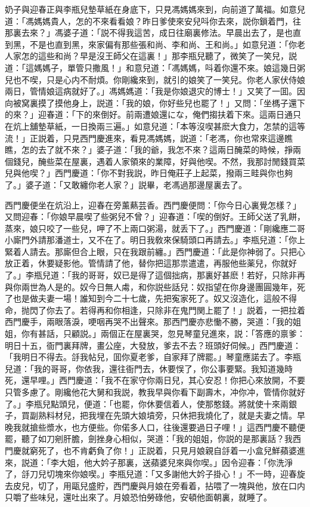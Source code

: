 奶子與迎春正與李瓶兒墊草紙在身底下，只見馮媽媽來到，向前道了萬福。如意兒道：「馮媽媽貴人，怎的不來看看娘？昨日爹使來安兒呌你去來，説你鎖着門，往那裏去來？」馮婆子道：「説不得我這苦，成日往廟裏修法。早晨出去了，是也直到黑，不是也直到黑，來家偏有那些張和尚、李和尚、王和尚。」如意兒道：「你老人家怎的這些和尚？早是沒王師父在這裏！」那李瓶兒聽了，微笑了一笑兒，説道：「這媽媽子，單管只撒風！」和意兒道：「馮媽媽，呌着你還不來。娘這幾日粥兒也不喫，只是心内不耐煩。你剛纔來到，就引的娘笑了一笑兒。你老人家伏侍娘兩日，管情娘這病就好了。」馮媽媽道：「我是你娘退灾的博士！」又笑了一囬。因向被窝裏摸了摸他身上，説道：「我的娘，你好些兒也罷了！」又問：「坐榪子還下的來？」迎春道：「下的來倒好。前兩遭娘還にな，俺們搊扶着下來。這兩日通只在炕上舖墊草紙，一日換兩三遍。」如意兒道：「本等沒喫甚麽大食力，怎禁的這等流！」正説着，只見西門慶進來，看見馮媽媽，説道：「老馮，你也常來這邊瞧瞧，怎的去了就不來？」婆子道：「我的爺，我怎不來？這兩日醃菜的時候，掙兩個錢兒，醃些菜在屋裏，遇着人家領來的業障，好與他喫。不然，我那討閒錢買菜兒與他喫？」西門慶道：「你不對我説，昨日俺莊子上起菜，撥兩三畦與你也夠了。」婆子道：「又敢纏你老人家？」説畢，老馮過那邊屋裏去了。

西門慶便坐在炕沿上，迎春在旁薰爇芸香。西門慶便問：「你今日心裏覺怎樣？」又問迎春：「你娘早晨喫了些粥兒不曾？」迎春道：「喫的倒好。王師父送了乳餅，蒸來，娘只咬了一些兒，呷了不上兩口粥湯，就丢下了。」西門慶道：「剛纔應二哥小廝門外請那潘道士，又不在了。明日我敎來保騎頭口再請去。」李瓶兒道：「你上緊着人請去。那廝但合上眼，只在我跟前纏。」西門慶道：「此是你神弱了。只把心放正着，休要疑影他。管情請了他，替你把這那祟遣遣，再服他些薬兒，你就好了。」李瓶兒道：「我的哥哥，奴已是得了這個拙病，那裏好甚麽！若好，只除非再與你兩世為人是的。奴今日無人䖏，和你説些話兒：奴指望在你身邊團圓幾年，死了也是做夫妻一場！誰知到今二十七歲，先把寃家死了。奴又沒造化，這般不得命，抛閃了你去了。若得再和你相逢，只除非在鬼門関上罷了！」説着，一把拉着西門慶手，兩眼落淚，哽咽再哭不出聲來。那西門慶亦悲慟不勝，哭道：「我的姐姐，你有甚話，只顧説。」兩個正在屋裏哭，忽見琴童兒進來，説：「答應的禀爹：明日十五，衙門裏拜牌，畫公座，大發放，爹去不去？班頭好伺候。」西門慶道：「我明日不得去。㧱我帖兒，囬你夏老爹，自家拜了牌罷。」琴童應諾去了。李瓶兒道：「我的哥哥，你依我，還往衙門去，休要悮了，你公事要緊。我知道幾時死，還早哩。」西門慶道：「我不在家守你兩日兒，其心安忍！你把心來放開，不要只管多慮了。剛纔他花大舅和我説，教我早與你看下副壽木，冲你冲，管情你就好了。」李瓶兒點頭兒，便道：「也罷，你休要信着人，使那憨錢。將就使十來兩銀子，買副熟料材兒，把我埋在先頭大娘墳旁，只休把我燒化了，就是夫妻之情。早晚我就搶些漿水，也方便些。你偌多人口，往後還要過日子哩！」這西門慶不聽便罷，聽了如刀剜肝膽，劍挫身心相似，哭道：「我的姐姐，你説的是那裏話？我西門慶就窮死了，也不肯虧負了你！」正説着，只見月娘親自㧱着一小盒兒鮮蘋婆進來，説道：「李大姐，他大妗子那裏，送蘋婆兒來與你喫。」因令迎春：「你洗淨了，㧱刀兒切塊來你娘喫。」李瓶兒道：「又多謝他大妗子掛心！」不一時，迎春旋去皮兒，切了，用甌兒盛貯，西門慶與月娘在旁看着，拈喂了一塊與他，放在口内只嚼了些味兒，還吐出來了。月娘恐怕勞碌他，安頓他面朝裏，就睡了。

